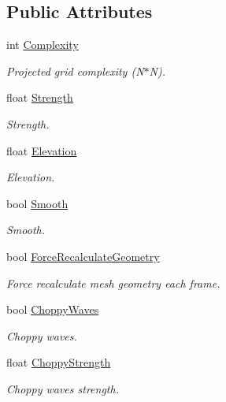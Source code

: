 \subsection*{Public Attributes}
\begin{CompactItemize}
\item 
int \hyperlink{struct_hydrax_1_1_module_1_1_projected_grid_1_1_options_155754beb2d89d3747e930b1705d3e66}{Complexity}
\begin{CompactList}\small\item\em Projected grid complexity (N$\ast$N). \item\end{CompactList}\item 
float \hyperlink{struct_hydrax_1_1_module_1_1_projected_grid_1_1_options_d92bbf285f94fbd26a5164187c8d433b}{Strength}
\begin{CompactList}\small\item\em Strength. \item\end{CompactList}\item 
float \hyperlink{struct_hydrax_1_1_module_1_1_projected_grid_1_1_options_da25050d6816620f94ca25cc01ef4c5d}{Elevation}
\begin{CompactList}\small\item\em Elevation. \item\end{CompactList}\item 
bool \hyperlink{struct_hydrax_1_1_module_1_1_projected_grid_1_1_options_1af465eea24f84ccf95ffb7fb40154d3}{Smooth}
\begin{CompactList}\small\item\em Smooth. \item\end{CompactList}\item 
bool \hyperlink{struct_hydrax_1_1_module_1_1_projected_grid_1_1_options_5a46c5be302d10a9c0886ccbe18cab40}{ForceRecalculateGeometry}
\begin{CompactList}\small\item\em Force recalculate mesh geometry each frame. \item\end{CompactList}\item 
bool \hyperlink{struct_hydrax_1_1_module_1_1_projected_grid_1_1_options_24d50dfd5e1e853394139f1a3e8e5ca9}{ChoppyWaves}
\begin{CompactList}\small\item\em Choppy waves. \item\end{CompactList}\item 
float \hyperlink{struct_hydrax_1_1_module_1_1_projected_grid_1_1_options_d4124f7740eb85dfb8ea0c903c7eb846}{ChoppyStrength}
\begin{CompactList}\small\item\em Choppy waves strength. \item\end{CompactList}\end{CompactItemize}


